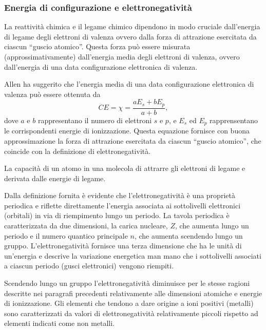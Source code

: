 \subsubsection{Energia di configurazione e elettronegatività}
La reattività chimica e il legame chimico dipendono in modo cruciale dall'energia di legame degli elettroni di valenza ovvero dalla forza di attrazione esercitata da ciascun “guscio atomico”. Questa forza può essere misurata (approssimativamente) dall'energia media degli elettroni di valenza, ovvero dall'energia di una data configurazione elettronica di valenza.

Allen ha suggerito che l'energia media di una data configurazione elettronica di valenza può essere ottenuta da
\begin{equation}
    CE=\chi=\frac{aE_s+bE_p}{a+b},
\end{equation}
dove $a$ e $b$ rappresentano il numero di elettroni $s$ e $p$, e $E_s$ ed $E_p$ rapprensentano le corrispondenti energie di ionizzazione. Questa equazione fornisce con buona approssimazione la forza di attrazione esercitata
da ciascun “guscio atomico”, che coincide con la definizione di elettronegatività.
\begin{defn}
    La capacità di un atomo in una molecola di attrarre gli elettroni di
legame e derivata dalle energie di legame.
\end{defn}
Dalla definizione fornita
è evidente che l'elettronegatività è una proprietà periodica e riflette direttamente l'energia associata ai
sottolivelli elettronici (orbitali) in via di riempimento lungo un periodo. La tavola periodica è caratterizzata
da due dimensioni, la carica nucleare, $Z$, che aumenta lungo un periodo e il numero quantico principale $n$,
che aumenta scendendo lungo un gruppo. L'elettronegatività fornisce una terza dimensione che ha le unità
di un'energia e descrive la variazione energetica man mano che i sottolivelli associati a ciascun periodo (gusci
elettronici) vengono riempiti.
\begin{obs}
    Scendendo lungo un gruppo l'elettronegatività diminuisce per le stesse ragioni
descritte nei paragrafi precedenti relativamente alle dimensioni atomiche e energie di ionizzazione. Gli
elementi che tendono a dare origine a ioni positivi (metalli) sono caratterizzati da valori di elettronegatività
relativamente piccoli rispetto ad elementi indicati come non metalli.
\end{obs}